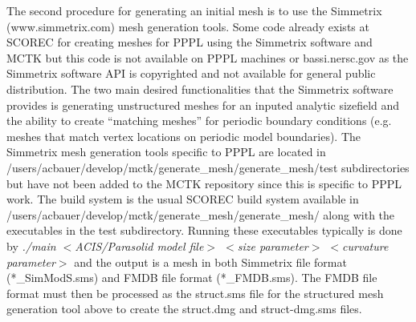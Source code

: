 The second procedure for generating an initial mesh is to use the Simmetrix (www.simmetrix.com)
mesh generation tools.  Some code already exists at SCOREC for creating meshes for PPPL 
using the Simmetrix
software and MCTK but this code is not available on PPPL machines or bassi.nersc.gov as the
Simmetrix software API is copyrighted and not available for general public distribution.  The two main
desired functionalities that the Simmetrix software provides is generating unstructured meshes
for an inputed analytic sizefield and the ability to create ``matching meshes'' for
periodic boundary conditions (e.g. meshes
that match vertex locations on periodic model boundaries).  The Simmetrix mesh generation tools
specific to PPPL are located in /users/acbauer/develop/mctk/generate\_mesh/generate\_mesh/test
subdirectories but have not been added to the MCTK repository since this is specific to PPPL work.
The build system is the usual SCOREC build system available in 
/users/acbauer/develop/mctk/generate\_mesh/generate\_mesh/
along with the executables in the test subdirectory.  Running these executables typically
is done by \textit{./main $<$ACIS/Parasolid model file$>$ $<$size parameter$>$ $<$curvature parameter$>$}
and the output is a mesh in both Simmetrix file format (*\_SimModS.sms) and
FMDB file format (*\_FMDB.sms).  The FMDB file format must then be processed as the struct.sms file
for the structured mesh generation tool above to create the struct.dmg and struct-dmg.sms files.

